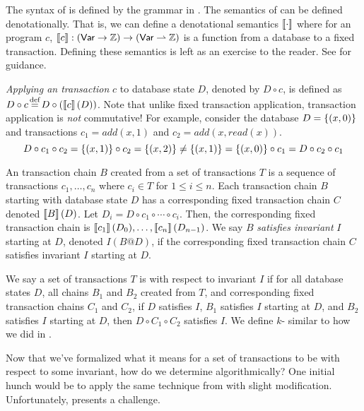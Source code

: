 The syntax of \imp{} is defined by the grammar in . The
semantics of \imp{} can be defined denotationally. That is, we can define a
denotational semantics $\left\llbracket\cdot\right\rrbracket$ where for an \imp{} program $c$,
$\left\llbracket c\right\rrbracket: (\textsf{Var} \to \mathbb{Z}) \to (\textsf{Var} \rightharpoonup \mathbb{Z})$ is a function
from a database to a fixed transaction. Defining these semantics is left as an
exercise to the reader.  See \cite{cs6110sp2016lecture19} for guidance.

\emph{Applying an \imp{} transaction} $c$ to database state $D$, denoted by $D
\circ c$, is defined as $D \circ c \defeq D \circ (\denote{c}(D))$.  Note that
unlike fixed transaction application, \imp{} transaction application is
\emph{not} commutative! For example, consider the database $D=\left\{(x, 0)\right\}$ and
\imp{} transactions $c_1 = add(x, 1)$ and $c_2 = add(x, read(x))$.
\[
  D \circ c_1 \circ c_2
    = \left\{(x, 1)\right\} \circ c_2
    = \left\{(x, 2)\right\}
    \neq \left\{(x, 1)\right\}
    = \left\{(x, 0)\right\} \circ c_1
    = D \circ c_2 \circ c_1
\]

An \imp{} transaction chain $B$ created from a set of \imp{} transactions $T$
is a sequence of \imp{} transactions $c_1, \ldots, c_n$ where $c_i \in T$ for
$1 \leq i \leq n$. Each \imp{} transaction chain $B$ starting with database
state $D$ has a corresponding fixed transaction chain $C$ denoted
$\left\llbracket B\right\rrbracket(D)$. Let $D_i = D \circ c_1 \circ \cdots \circ c_i$. Then, the
corresponding fixed transaction chain is $\left\llbracket c_1\right\rrbracket(D_0), \ldots,
\left\llbracket c_n\right\rrbracket(D_{n-1})$. We say $B$ \emph{satisfies invariant} $I$ starting at
$D$, denoted $I(B@D)$, if the corresponding fixed transaction chain $C$
satisfies invariant $I$ starting at $D$.

We say a set of \imp{} transactions $T$ is \iconfluent{} with respect to
invariant $I$ if for all database states $D$, all \imp{} chains $B_1$ and $B_2$
created from $T$, and corresponding fixed transaction chains $C_1$ and $C_2$,
if $D$ satisfies $I$, $B_1$ satisfies $I$ starting at $D$, and $B_2$ satisfies
$I$ starting at $D$, then $D \circ C_1 \circ C_2$ satisfies $I$. We define
$k$-\iconfluence{} similar to how we did in .

Now that we've formalized what it means for a set of \imp{} transactions to be
\iconfluent{} with respect to some invariant, how do we determine
\iconfluence{} algorithmically? One initial hunch would be to apply the same
technique from  with slight modification. Unfortunately,
 presents a challenge.

